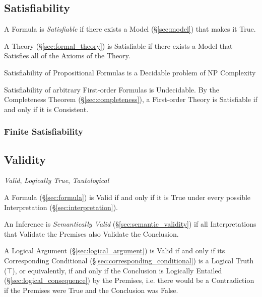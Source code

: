 \subsection{Satisfiability}\label{sec:satisfiability}

A Formula is \emph{Satisfiable} if there exists a Model
(\S\ref{sec:model}) that makes it True.

A Theory (\S\ref{sec:formal_theory}) is Satisfiable if there exists a
Model that Satisfies all of the Axioms of the Theory.

Satisfiability of Propositional Formulas is a Decidable problem of NP
Complexity %

Satisfiability of arbitrary First-order Formulas is Undecidable. By
the Completeness Theorem (\S\ref{sec:completeness}), a First-order
Theory is Satisfiable if and only if it is Consistent.



\subsubsection{Finite Satisfiability}\label{sec:finite_satisfiability}



\subsection{Validity}\label{sec:validity}

\emph{Valid}, \emph{Logically True}, \emph{Tautological}

A Formula (\S\ref{sec:formula}) is Valid if and only if it is True under every
possible Interpretation (\S\ref{sec:interpretation}).

An Inference is \emph{Semantically Valid} (\S\ref{sec:semantic_validity}) if all
Interpretations that Validate the Premises also Validate the Conclusion.

A Logical Argument (\S\ref{sec:logical_argument}) is Valid if and only if its
Corresponding Conditional (\S\ref{sec:corresponding_conditional}) is a Logical
Truth ($\top$), or equivalently, if and only if the Conclusion is Logically
Entailed (\S\ref{sec:logical_consequence}) by the Premises, i.e. there would be
a Contradiction if the Premises were True and the Conclusion was False.

